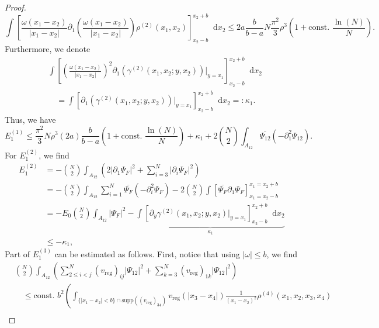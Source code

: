 \documentclass[a4paper,11pt]{article}
\newcommand{\supp}{\text{supp}}
\newcommand{\abs}[1]{\left\lvert #1 \right\rvert}
\newcommand*\diff{\mathop{}\!\mathrm{d}}
\numberwithin{equation}{section}
\begin{document}
\begin{proof}
\begin{equation}
			\int\left[\frac{\omega(x_1-x_2)}{\abs{x_1-x_2}}\partial_{1}\left(\frac{\omega(x_1-x_2)}{\abs{x_1-x_2}}\right)\rho^{(2)}(x_1,x_2)\right]_{x_2-b}^{x_2+b}\diff x_2\leq 2a\frac{b}{b-a} N\frac{\pi^2}{3}\rho^3\left(1+\text{const. }\frac{\ln(N)}{N}\right).
		\end{equation}
		Furthermore, we denote \begin{equation}\label{EqGammaDeriv2.}
			\begin{aligned}
				&\int\left[\left(\frac{\omega(x_1-x_2)}{\abs{x_1-x_2}}\right)^2\partial_{1}\left(\gamma^{(2)}(x_1,x_2;y,x_2)\right)\bigg\vert_{y=x_1}\right]_{x_2-b}^{x_2+b}\diff x_2\\
				&\quad=\int\left[\partial_{1}\left(\gamma^{(2)}(x_1,x_2;y,x_2)\right)\bigg\vert_{y=x_1}\right]_{x_2-b}^{x_2+b}\diff x_2=:\kappa_1.
			\end{aligned}
		\end{equation}
		Thus, we have \begin{equation}
			E_1^{(1)}\leq\frac{\pi^2}{3}N\rho^3 (2a)\frac{b}{b-a}\left(1+\text{const. }\frac{\ln(N)}{N}\right)+\kappa_1+2\binom{N}{2}\int_{A_{12}}\overline{\Psi_{12}}(-\partial^2_1\Psi_{12}).
		\end{equation}
		For $E_1^{(2)}$, we find \begin{equation}
			\begin{aligned}
				E_1^{(2)}&=-\binom{N}{2}\int_{A_{12}}\left(2\abs{\partial_1\Psi_F}^2+\sum_{i=3}^{N}\abs{\partial_i\Psi_F}^2\right)\\&=-\binom{N}{2}\int_{A_{12}}\sum_{i=1}^{N}\overline{\Psi_F}(-\partial^2_i\Psi_F)-2\binom{N}{2}\int\left[\overline{\Psi_F}\partial_1\Psi_F\right]_{x_1=x_2-b}^{x_1=x_2+b}\\
				&=-E_0\binom{N}{2}\int_{A_{12}}\abs{\Psi_F}^2-\underbrace{\int\left[\partial_y\gamma^{(2)}(x_1,x_2;y,x_2)\vert_{y=x_1}\right]_{x_2-b}^{x_2+b} \diff x_2}_{\kappa_1}\\
				&\leq -\kappa_1,
			\end{aligned}
		\end{equation}
		Part of $E_1^{(3)}$ can be estimated as follows.
		First, notice that using $\abs{\omega}\leq b$, we find\begin{equation}
			\begin{aligned}
				&\binom{N}{2}\int_{A_{12}} \left(\sum_{2\leq i<j}^{N}(v_{\text{reg}})_{ij}\abs{\Psi_{12}}^2+\sum_{k=3}^{N}(v_{\text{reg}})_{1k}\abs{\Psi_{12}}^2\right)\\&\quad\leq \text{const. }b^2 \left(\int_{\{\abs{x_1-x_2}<b\}\cap\supp((v_{\text{reg}})_{34})}v_{\text{reg}}(\abs{x_3-x_4})\frac{1}{(x_1-x_2)^2}\rho^{(4)}(x_1,x_2,x_3,x_4)\right.\\

\end{aligned}
\end{equation}
\end{proof}
\end{document}
